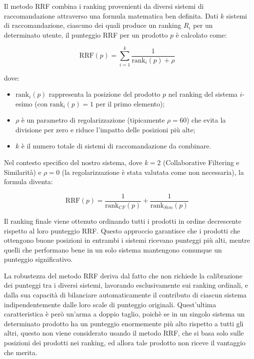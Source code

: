Il metodo RRF combina i ranking provenienti da diversi sistemi di raccomandazione attraverso una formula matematica ben definita. Dati $k$ sistemi di raccomandazione, ciascuno dei quali produce un ranking $R_i$ per un determinato utente, il punteggio RRF per un prodotto $p$ è calcolato come:

\begin{equation}
\text{RRF}(p) = \sum_{i=1}^{k} \frac{1}{\text{rank}_i(p) + \rho}
\end{equation}

dove:
\begin{itemize}
    \item $\text{rank}_i(p)$ rappresenta la posizione del prodotto $p$ nel ranking del sistema $i$-esimo (con $\text{rank}_i(p) = 1$ per il primo elemento);
    \item $\rho$ è un parametro di regolarizzazione (tipicamente $\rho = 60$) che evita la divisione per zero e riduce l'impatto delle posizioni più alte;
    \item $k$ è il numero totale di sistemi di raccomandazione da combinare.
\end{itemize}

Nel contesto specifico del nostro sistema, dove $k = 2$ (Collaborative Filtering e Similarità) e $\rho = 0$ (la regolarizzazione è stata valutata come non necessaria), la formula diventa:

\begin{equation}
\text{RRF}(p) = \frac{1}{\text{rank}_{CF}(p)} + \frac{1}{\text{rank}_{Sim}(p)}
\end{equation}

Il ranking finale viene ottenuto ordinando tutti i prodotti in ordine decrescente rispetto al loro punteggio RRF. Questo approccio garantisce che i prodotti che ottengono buone posizioni in entrambi i sistemi ricevano punteggi più alti, mentre quelli che performano bene in un solo sistema mantengono comunque un punteggio significativo.

La robustezza del metodo RRF deriva dal fatto che non richiede la calibrazione dei punteggi tra i diversi sistemi, lavorando esclusivamente sui ranking ordinali, e dalla sua capacità di bilanciare automaticamente il contributo di ciascun sistema indipendentemente dalle loro scale di punteggio originali. Quest'ultima caratteristica è però un'arma a doppio taglio, poichè se in un singolo sistema un determinato prodotto ha un punteggio enormemente più alto rispetto a tutti gli altri, questo non viene considerato usando il metodo RRF, che si basa solo sulle posizioni dei prodotti nei ranking, ed allora tale prodotto non riceve il vantaggio che merita.

